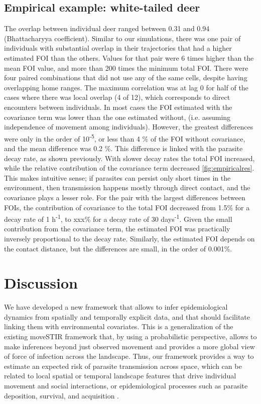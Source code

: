 \documentclass[letterpaper]{article}
\begin{document}
\subsection*{Empirical example: white-tailed deer}
The overlap between individual deer ranged between 0.31 and 0.94 (Bhattacharyya coefficient). 
Similar to our simulations, there was one pair of individuals with substantial overlap in their trajectories that had a higher estimated FOI than the others. Values for that pair were 6 times higher than the mean FOI value, and more than 200 times the minimum total FOI. 
There were four paired combinations that did not use any of the same cells, despite having overlapping home ranges. %
The maximum correlation was at lag 0 for half of the cases where there was local overlap (4 of 12), which corresponds to direct encounters between individuals.
In most cases the FOI estimated with the covariance term was lower than the one estimated without, (i.e. assuming independence of movement among individuals). However, the greatest differences were only in the order of 10\textsuperscript{-5}, or less than 4 \% of the FOI without covariance, and the mean difference was 0.2 \%.
This difference is linked with the parasite decay rate, as shown previously. With slower decay rates the total FOI increased, while the relative contribution of the covariance term decreased \ref{fig:empiricalres}. 
This makes intuitive sense; if parasites can persist only short times in the environment, then transmission happens mostly through direct contact, and the covariance plays a lesser role. 
For the pair with the largest differences between FOIs, the contribution of covariance to the total FOI decreased from 1.5\% for a decay rate of 1 h\textsuperscript{-1}, to xxx\% for a decay rate of 30 days\textsuperscript{-1}.
Given the small contribution from the covariance term, the estimated FOI was practically inversely proportional to the decay rate. 
Similarly, the estimated FOI depends on the contact distance, but the differences are small, in the order of 0.001\%. 


\section*{Discussion}
We have developed a new framework that allows to infer epidemiological dynamics from spatially and temporally explicit data, and that should facilitate linking them with environmental covariates. This is a generalization of the existing moveSTIR framework \citep{Wilber2022} that, by using a probabilistic perspective, allows to make inferences beyond just observed movement and provides a more global view of force of infection across the landscape. 
Thus, our framework provides a way to estimate an expected risk of parasite transmission across space, which can be related to local spatial or temporal landscape features that drive individual movement and social interactions, or epidemiological processes such as parasite deposition, survival, and acquisition \citep{Merkle2018,VanderWaal2017}. 
\end{document}
